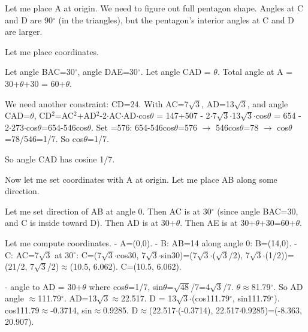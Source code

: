 \begin{decodedreasoningpanel}
Let me place A at origin. We need to figure out full pentagon shape. Angles at C and D are 90\ensuremath{^\circ} (in the triangles), but the pentagon's interior angles at C and D are larger.

Let me place coordinates.

Let angle BAC=30\ensuremath{^\circ}, angle DAE=30\ensuremath{^\circ}. Let angle CAD = \ensuremath{\theta}. Total angle at A = 30+\ensuremath{\theta}+30 = 60+\ensuremath{\theta}.

We need another constraint: CD=24. With AC=7\ensuremath{\sqrt{3}}, AD=13\ensuremath{\sqrt{3}}, and angle CAD=\ensuremath{\theta}, CD\ensuremath{^2}=AC\ensuremath{^2}+AD\ensuremath{^2}-2\ensuremath{\cdot}AC\ensuremath{\cdot}AD\ensuremath{\cdot}cos\ensuremath{\theta} = 147+507 - 2\ensuremath{\cdot}7\ensuremath{\sqrt{3}}\ensuremath{\cdot}13\ensuremath{\sqrt{3}}\ensuremath{\cdot}cos\ensuremath{\theta} = 654 - 2\ensuremath{\cdot}273\ensuremath{\cdot}cos\ensuremath{\theta}=654-546cos\ensuremath{\theta}. Set =576: 654-546cos\ensuremath{\theta}=576 \ensuremath{\rightarrow} 546cos\ensuremath{\theta}=78 \ensuremath{\rightarrow} cos\ensuremath{\theta}=78/546=1/7. So cos\ensuremath{\theta}=1/7.

So angle CAD has cosine 1/7.

Now let me set coordinates with A at origin. Let me place AB along some direction.

Let me set direction of AB at angle 0. Then AC is at 30\ensuremath{^\circ} (since angle BAC=30, and C is inside toward D). Then AD is at 30+\ensuremath{\theta}. Then AE is at 30+\ensuremath{\theta}+30=60+\ensuremath{\theta}.

Let me compute coordinates.
- A=(0,0).
- B: AB=14 along angle 0: B=(14,0).
- C: AC=7\ensuremath{\sqrt{3}} at 30\ensuremath{^\circ}: C=(7\ensuremath{\sqrt{3}}\ensuremath{\cdot}cos30, 7\ensuremath{\sqrt{3}}\ensuremath{\cdot}sin30)=(7\ensuremath{\sqrt{3}}\ensuremath{\cdot}(\ensuremath{\sqrt{3}}/2), 7\ensuremath{\sqrt{3}}\ensuremath{\cdot}(1/2))=(21/2, 7\ensuremath{\sqrt{3}}/2)\ensuremath{\approx}(10.5, 6.062). C=(10.5, 6.062).

- angle to AD = 30+\ensuremath{\theta} where cos\ensuremath{\theta}=1/7, sin\ensuremath{\theta}=\ensuremath{\sqrt{48}}/7=4\ensuremath{\sqrt{3}}/7. \ensuremath{\theta}\ensuremath{\approx}81.79\ensuremath{^\circ}. So AD angle \ensuremath{\approx}111.79\ensuremath{^\circ}. AD=13\ensuremath{\sqrt{3}}\ensuremath{\approx}22.517.
  D = 13\ensuremath{\sqrt{3}}\ensuremath{\cdot}(cos111.79\ensuremath{^\circ}, sin111.79\ensuremath{^\circ}). cos111.79\ensuremath{\approx}-0.3714, sin\ensuremath{\approx}0.9285. 
  D\ensuremath{\approx}(22.517\ensuremath{\cdot}(-0.3714), 22.517\ensuremath{\cdot}0.9285)=(-8.363, 20.907).


\end{decodedreasoningpanel}

